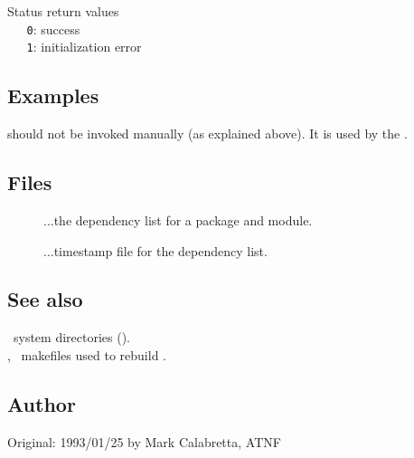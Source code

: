 Status return values
\\ \verb+   0+: success
\\ \verb+   1+: initialization error

\subsection*{Examples}

 should not be invoked manually (as explained above).  It is used
by the  .

\subsection*{Files}

\begin{description}
\item[]
...the dependency list for a package and module.

\item[]
...timestamp file for the dependency list.
\end{description}

\subsection*{See also}

\aipspp\ system directories ().\\
, \gnu\ makefiles used to rebuild \aipspp.

\subsection*{Author}

Original: 1993/01/25 by Mark Calabretta, ATNF


\newpage
\section{}
\label{gmake}

